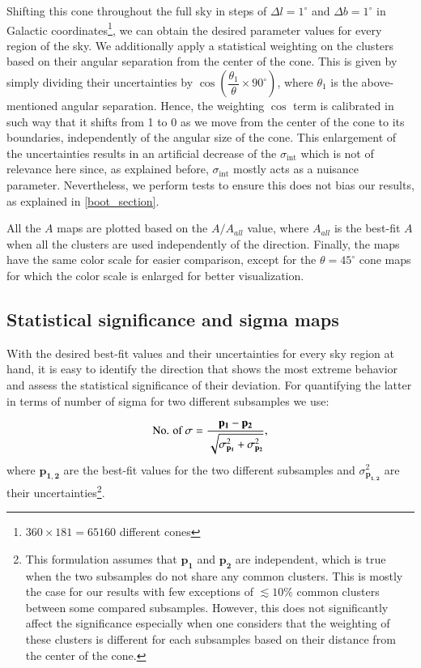 \documentclass{aa}   %
\begin{document}
Shifting this cone throughout the full sky in steps of $\Delta l=1^{\circ}$ and  $\Delta b=1^{\circ}$ in Galactic coordinates\footnote{$360\times 181=65160$ different cones}, we can obtain the desired parameter values for every region of the sky. We additionally apply a statistical weighting on the clusters based on their angular separation from the center of the cone. This is given by simply dividing their uncertainties by $\cos{\left(\dfrac{\theta_1}{\theta}\times 90^{\circ}\right)}$, where $\theta_1$ is the above-mentioned angular separation. Hence, the weighting $\cos$ term is calibrated in such way that it shifts from 1 to 0 as we move from the center of the cone to its boundaries, independently of the angular size of the cone. This enlargement of the uncertainties results in an artificial decrease of the $\sigma_{\text{int}}$ which is not of relevance here since, as explained before, $\sigma_{\text{int}}$ mostly acts as a nuisance parameter. Nevertheless, we perform tests to ensure this does not bias our results, as explained in \ref{boot_section}. 

All the $A$ maps are plotted based on the $A/A_{all}$ value, where $A_{all}$ is the best-fit $A$ when all the clusters are used independently of the direction. Finally, the maps have the same color scale for easier comparison, except for the $\theta=45^{\circ}$ cone maps for which the color scale is enlarged for better visualization. 

\subsection{Statistical significance and sigma maps} \label{sigma_maps}

With the desired best-fit values and their uncertainties for every sky region at hand, it is easy to identify the direction that shows the most extreme behavior and assess the statistical significance of their deviation. For quantifying the latter in terms of number of sigma for two different subsamples we use:

\begin{equation}
\centering
\text{No. of }\sigma=\dfrac{\mathbf{p_1}-\mathbf{p_2}}{\sqrt{\sigma^2_{\mathbf{p_1}}+\sigma^2_{\mathbf{p_2}}}},
\label{sigma_sig}
\end{equation}
where $\mathbf{p_{1,2}}$ are the best-fit values for the two different subsamples and $\sigma^2_{\mathbf{p_{1,2}}}$ are their uncertainties\footnote{This formulation assumes that $\mathbf{p_{1}}$ and $\mathbf{p_{2}}$ are independent, which is true when the two subsamples do not share any common clusters. This is mostly the case for our results with few exceptions of $\lesssim 10\%$ common clusters between some compared subsamples. However, this does not significantly affect the significance especially when one considers that the weighting of these clusters is different for each subsamples based on their distance from the center of the cone.}. 
\end{document}

